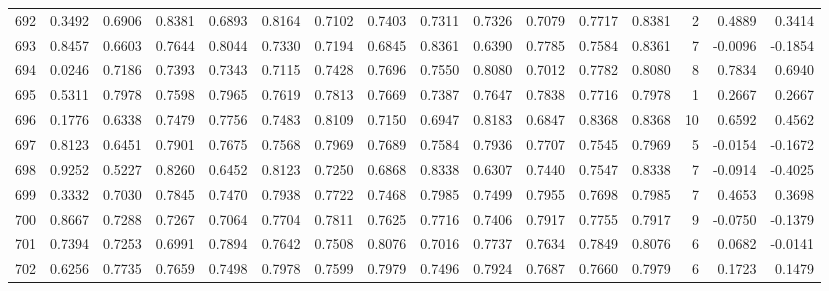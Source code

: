 \begin{tabular}{lrrrrrrrrrrrrrrr}
692 &      0.3492 &  0.6906 &  0.8381 &  0.6893 &  0.8164 &  0.7102 &  0.7403 &  0.7311 &  0.7326 &  0.7079 &   0.7717 &     0.8381 &      2 &                    0.4889 &                     0.3414 \\
693 &      0.8457 &  0.6603 &  0.7644 &  0.8044 &  0.7330 &  0.7194 &  0.6845 &  0.8361 &  0.6390 &  0.7785 &   0.7584 &     0.8361 &      7 &                   -0.0096 &                    -0.1854 \\
694 &      0.0246 &  0.7186 &  0.7393 &  0.7343 &  0.7115 &  0.7428 &  0.7696 &  0.7550 &  0.8080 &  0.7012 &   0.7782 &     0.8080 &      8 &                    0.7834 &                     0.6940 \\
695 &      0.5311 &  0.7978 &  0.7598 &  0.7965 &  0.7619 &  0.7813 &  0.7669 &  0.7387 &  0.7647 &  0.7838 &   0.7716 &     0.7978 &      1 &                    0.2667 &                     0.2667 \\
696 &      0.1776 &  0.6338 &  0.7479 &  0.7756 &  0.7483 &  0.8109 &  0.7150 &  0.6947 &  0.8183 &  0.6847 &   0.8368 &     0.8368 &     10 &                    0.6592 &                     0.4562 \\
697 &      0.8123 &  0.6451 &  0.7901 &  0.7675 &  0.7568 &  0.7969 &  0.7689 &  0.7584 &  0.7936 &  0.7707 &   0.7545 &     0.7969 &      5 &                   -0.0154 &                    -0.1672 \\
698 &      0.9252 &  0.5227 &  0.8260 &  0.6452 &  0.8123 &  0.7250 &  0.6868 &  0.8338 &  0.6307 &  0.7440 &   0.7547 &     0.8338 &      7 &                   -0.0914 &                    -0.4025 \\
699 &      0.3332 &  0.7030 &  0.7845 &  0.7470 &  0.7938 &  0.7722 &  0.7468 &  0.7985 &  0.7499 &  0.7955 &   0.7698 &     0.7985 &      7 &                    0.4653 &                     0.3698 \\
700 &      0.8667 &  0.7288 &  0.7267 &  0.7064 &  0.7704 &  0.7811 &  0.7625 &  0.7716 &  0.7406 &  0.7917 &   0.7755 &     0.7917 &      9 &                   -0.0750 &                    -0.1379 \\
701 &      0.7394 &  0.7253 &  0.6991 &  0.7894 &  0.7642 &  0.7508 &  0.8076 &  0.7016 &  0.7737 &  0.7634 &   0.7849 &     0.8076 &      6 &                    0.0682 &                    -0.0141 \\
702 &      0.6256 &  0.7735 &  0.7659 &  0.7498 &  0.7978 &  0.7599 &  0.7979 &  0.7496 &  0.7924 &  0.7687 &   0.7660 &     0.7979 &      6 &                    0.1723 &                     0.1479 \\

\end{tabular}
